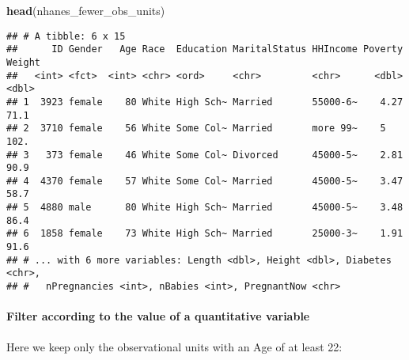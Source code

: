 \documentclass[]{article}
\newenvironment{Shaded}{\begin{snugshade}}{\end{snugshade}}
\newcommand{\KeywordTok}[1]{\textcolor[rgb]{0.13,0.29,0.53}{\textbf{#1}}}
\newcommand{\DecValTok}[1]{\textcolor[rgb]{0.00,0.00,0.81}{#1}}
\newcommand{\StringTok}[1]{\textcolor[rgb]{0.31,0.60,0.02}{#1}}
\newcommand{\OperatorTok}[1]{\textcolor[rgb]{0.81,0.36,0.00}{\textbf{#1}}}
\newcommand{\NormalTok}[1]{#1}
\let\oldparagraph\paragraph
\renewcommand{\paragraph}[1]{\oldparagraph{#1}\mbox{}}
\begin{document}
\begin{Shaded}
\end{Shaded}

\begin{Shaded}
\begin{Highlighting}[]
\KeywordTok{head}\NormalTok{(nhanes_fewer_obs_units)}
\end{Highlighting}
\end{Shaded}

\begin{verbatim}
## # A tibble: 6 x 15
##      ID Gender   Age Race  Education MaritalStatus HHIncome Poverty Weight
##   <int> <fct>  <int> <chr> <ord>     <chr>         <chr>      <dbl>  <dbl>
## 1  3923 female    80 White High Sch~ Married       55000-6~    4.27   71.1
## 2  3710 female    56 White Some Col~ Married       more 99~    5     102. 
## 3   373 female    46 White Some Col~ Divorced      45000-5~    2.81   90.9
## 4  4370 female    57 White Some Col~ Married       45000-5~    3.47   58.7
## 5  4880 male      80 White High Sch~ Married       45000-5~    3.48   86.4
## 6  1858 female    73 White High Sch~ Married       25000-3~    1.91   91.6
## # ... with 6 more variables: Length <dbl>, Height <dbl>, Diabetes <chr>,
## #   nPregnancies <int>, nBabies <int>, PregnantNow <chr>
\end{verbatim}

\paragraph{Filter according to the value of a quantitative
variable}\label{filter-according-to-the-value-of-a-quantitative-variable}

Here we keep only the observational units with an Age of at least 22:

\begin{Shaded}
\end{Shaded}
\end{document}
